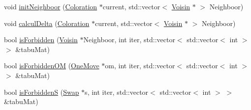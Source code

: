 \begin{DoxyCompactItemize}
\item 
void \hyperlink{classIteratedTabuSearch_a29d81ae224f2197028ea2e9123a4ccaf}{init\-Neighboor} (\hyperlink{classColoration}{Coloration} $\ast$current, std\-::vector$<$ \hyperlink{classVoisin}{Voisin} $\ast$ $>$ Neighboor)
\item 
void \hyperlink{classIteratedTabuSearch_a62cced18d98054d880e32b84210bb78b}{calcul\-Delta} (\hyperlink{classColoration}{Coloration} $\ast$current, std\-::vector$<$ \hyperlink{classVoisin}{Voisin} $\ast$ $>$ Neighboor)
\item 
bool \hyperlink{classIteratedTabuSearch_a172b9a095a199cce3db7c3536d774d3c}{is\-Forbidden} (\hyperlink{classVoisin}{Voisin} $\ast$Neighboor, int iter, std\-::vector$<$ std\-::vector$<$ int $>$ $>$ \&tabu\-Mat)
\item 
bool \hyperlink{classIteratedTabuSearch_a55789ed9cb641a8cfeb56bbe3e6d12ce}{is\-Forbidden\-O\-M} (\hyperlink{classOneMove}{One\-Move} $\ast$om, int iter, std\-::vector$<$ std\-::vector$<$ int $>$ $>$ \&tabu\-Mat)
\item 
bool \hyperlink{classIteratedTabuSearch_a15c39398f2bb21371beee1542512cb97}{is\-Forbidden\-S} (\hyperlink{classSwap}{Swap} $\ast$s, int iter, std\-::vector$<$ std\-::vector$<$ int $>$ $>$ \&tabu\-Mat)
\end{DoxyCompactItemize}


